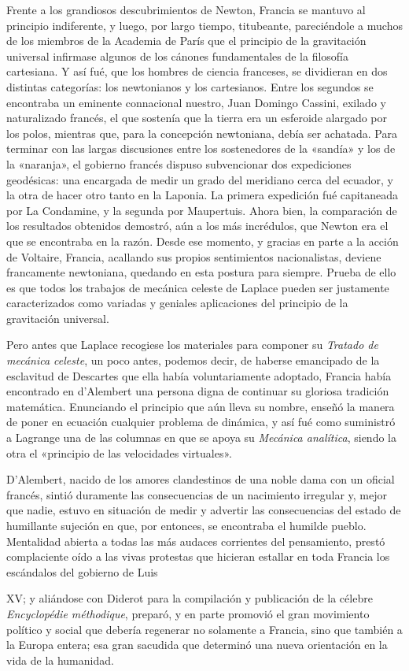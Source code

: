 \documentclass[a4paper, 12pt, draft]{article}
\begin{document}
{%

Frente a los grandiosos descubrimientos de Newton, Francia se mantuvo al principio indiferente, y luego, por largo tiempo, titubeante, pareciéndole a muchos de los miembros de la Academia de París que el principio de la gravitación universal infirmase algunos de los cánones fundamentales de la filosofía cartesiana. Y así fué, que los hombres de ciencia franceses, se dividieran en dos distintas categorías: los newtonianos y los cartesianos. Entre los segundos se encontraba un eminente connacional nuestro, Juan Domingo Cassini, exilado y naturalizado francés, el que sostenía que la tierra era un esferoide alargado por los polos, mientras que, para la concepción newtoniana, debía ser achatada. Para terminar con las largas discusiones entre los sostenedores de la «sandía» y los de la «naranja», el gobierno francés dispuso subvencionar dos expediciones geodésicas: una encargada de medir un grado del meridiano cerca del ecuador, y la otra de hacer otro tanto en la Laponia. La primera expedición fué capitaneada por La Condamine, y la segunda por Maupertuis. Ahora bien, la comparación de los resultados obtenidos demostró, aún a los más incrédulos, que Newton era el que se encontraba en la razón. Desde ese momento, y gracias en parte a la acción de Voltaire, Francia, acallando sus propios sentimientos nacionalistas, deviene francamente newtoniana, quedando en esta postura para siempre. Prueba de ello es que todos los trabajos de mecánica celeste de Laplace pueden ser justamente caracterizados como variadas y geniales aplicaciones del principio de la gravitación universal.



Pero antes que Laplace recogiese los materiales para componer su \textit{ Tratado de mecánica celeste}, un poco antes, podemos decir, de haberse emancipado de la esclavitud de Descartes que ella había voluntariamente adoptado, Francia había encontrado en d'Alembert una persona digna de continuar su gloriosa tradición matemática. Enunciando el principio que aún lleva su nombre, enseñó la manera de poner en ecuación cualquier problema de dinámica, y así fué como suministró a Lagrange una de las columnas en que se apoya su \textit{ Mecánica analítica}, siendo la otra el «principio de las velocidades virtuales».

D'Alembert, nacido de los amores clandestinos de una noble dama con un oficial francés, sintió duramente las consecuencias de un nacimiento irregular y, mejor que nadie, estuvo en situación de medir y advertir las consecuencias del estado de humillante sujeción en que, por entonces, se encontraba el humilde pueblo. Mentalidad abierta a todas las más audaces corrientes del pensamiento, prestó complaciente oído a las vivas protestas que hicieran estallar en toda Francia los escándalos del gobierno de Luis {XV; y aliándose con Diderot para la compilación y publicación de la célebre \textit{ Encyclopédie méthodique}, preparó, y en parte promovió el gran movimiento político y social que debería regenerar no solamente a Francia, sino que también a la Europa entera; esa gran sacudida que determinó una nueva orientación en la vida de la humanidad.

}}
\end{document}
